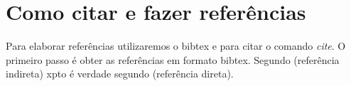 \documentclass[a4paper]{abntex2}
\begin{document}
\chapter{Como citar e fazer referências}
Para elaborar referências utilizaremos o bibtex e para citar o comando \emph{cite}. O primeiro passo é obter as referências em formato bibtex. Segundo \cite{Kira1992, Kononenko94} (referência indireta) xpto é verdade segundo  (referência direta).




\end{document}
